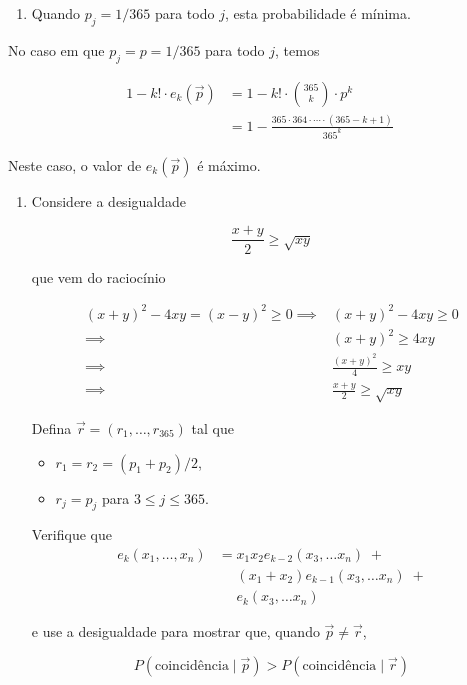 \documentclass[
  11pt]{report}
\providecommand{\tightlist}{%
  \setlength{\itemsep}{0pt}\setlength{\parskip}{0pt}}
\begin{document}
\begin{rmdbox}

\begin{enumerate}
\def\labelenumi{\alph{enumi}.}
\setcounter{enumi}{1}
\tightlist
\item
  Quando $p_j = 1/365$ para todo $j$, esta probabilidade é mínima.
\end{enumerate}

\end{rmdbox}

No caso em que $p_j = p = 1/365$ para todo $j$, temos

\[
   \begin{aligned}
     1 - k! \cdot e_k(\vec p) 
     &=
     1 - k! \cdot \binom{365}{k} \cdot p^k \\
     &=
     1 - \frac{365 \cdot 364 \cdot \cdots \cdot (365 - k + 1)}{365^k}
   \end{aligned}
   \]

Neste caso, o valor de $e_k(\vec p)$ é máximo.

\begin{rmdbox}

\begin{enumerate}
\def\labelenumi{\alph{enumi}.}
\setcounter{enumi}{2}
\item
  Considere a desigualdade

  \[
  \frac{x + y}{2} \geq \sqrt{xy}
  \]

  que vem do raciocínio

  \[
  \begin{aligned}
    (x + y)^2 - 4xy = (x - y)^2 \geq 0
    \implies &
    (x + y)^2 - 4xy \geq 0
    \\
    \implies &
    (x + y)^2 \geq 4xy
    \\
    \implies &
    \frac{(x + y)^2}{4} \geq xy
    \\
    \implies &
    \frac{x + y}{2} \geq \sqrt{xy}
  \end{aligned}
  \]

  Defina $\vec r = (r_1, \ldots, r_{365})$ tal que

  \begin{itemize}
  \item
    $r_1 = r_2 = (p_1 + p_2)/2$,
  \item
    $r_j = p_j$ para $3 \leq j \leq 365$.
  \end{itemize}

  Verifique que
  \[
  \begin{aligned}
    e_k(x_1, \ldots, x_n)
    &=
    x_1 x_2 e_{k-2}(x_3, \ldots x_n) \;+ \\
    &\phantom{{}={}} (x_1 + x_2) e_{k-1}(x_3, \ldots x_n) \;+ \\
    &\phantom{{}={}} e_{k}(x_3, \ldots x_n)
  \end{aligned}
  \]

  e use a desigualdade para mostrar que, quando $\vec p \neq \vec r$,

  \[
  P( \text{coincidência} \mid \vec p) 
  >
  P( \text{coincidência} \mid \vec r)
  \]
\end{enumerate}

\end{rmdbox}
\end{document}
